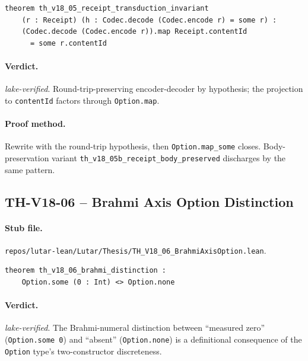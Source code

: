 \begin{theorem}
\label{thm:thv18-05}
\begin{verbatim}
theorem th_v18_05_receipt_transduction_invariant
    (r : Receipt) (h : Codec.decode (Codec.encode r) = some r) :
    (Codec.decode (Codec.encode r)).map Receipt.contentId
      = some r.contentId
\end{verbatim}
\end{theorem}

\paragraph{Verdict.} \emph{lake-verified}. Round-trip-preserving
encoder-decoder by hypothesis; the projection to \texttt{contentId}
factors through \texttt{Option.map}.

\paragraph{Proof method.} Rewrite with the round-trip hypothesis,
then \texttt{Option.map\_some} closes. Body-preservation variant
\texttt{th\_v18\_05b\_receipt\_body\_preserved} discharges by the
same pattern.

\subsection{TH-V18-06 -- Brahmi Axis Option Distinction}
\label{sub:thv18-06}

\paragraph{Stub file.}
\texttt{repos/lutar-lean/Lutar/Thesis/TH\_V18\_06\_BrahmiAxisOption.lean}.

\begin{theorem}
\label{thm:thv18-06}
\begin{verbatim}
theorem th_v18_06_brahmi_distinction :
    Option.some (0 : Int) <> Option.none
\end{verbatim}
\end{theorem}

\paragraph{Verdict.} \emph{lake-verified}. The Brahmi-numeral
distinction between ``measured zero'' (\texttt{Option.some 0}) and
``absent'' (\texttt{Option.none}) is a definitional consequence of
the \texttt{Option} type's two-constructor discreteness.

